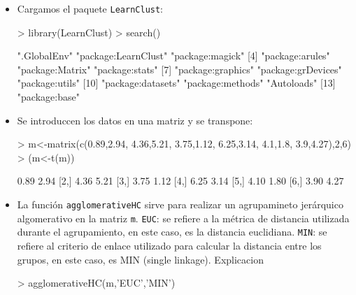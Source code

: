 \documentclass[a4paper, 12pt]{article}
\begin{document}
	\begin{itemize}
	  \item Cargamos el paquete \texttt{LearnClust}:
\begin{Schunk}
\begin{Sinput}
> library(LearnClust)
> search()
\end{Sinput}
\begin{Soutput}
 [1] ".GlobalEnv"         "package:LearnClust" "package:magick"    
 [4] "package:arules"     "package:Matrix"     "package:stats"     
 [7] "package:graphics"   "package:grDevices"  "package:utils"     
[10] "package:datasets"   "package:methods"    "Autoloads"         
[13] "package:base"      
\end{Soutput}
\end{Schunk}
		\item Se introduccen los datos en una matriz y se transpone:
\begin{Schunk}
\begin{Sinput}
> m<-matrix(c(0.89,2.94, 4.36,5.21, 3.75,1.12, 6.25,3.14, 4.1,1.8, 3.9,4.27),2,6)
> (m<-t(m))
\end{Sinput}
\begin{Soutput}
     [,1] [,2]
[1,] 0.89 2.94
[2,] 4.36 5.21
[3,] 3.75 1.12
[4,] 6.25 3.14
[5,] 4.10 1.80
[6,] 3.90 4.27
\end{Soutput}
\end{Schunk}
		\item La función \texttt{agglomerativeHC} sirve para realizar un agrupamineto jerárquico algomerativo en la matriz \texttt{m}.
		\texttt{EUC}: se refiere a la métrica de distancia utilizada durante el agrupamiento, en este caso, es la distancia euclidiana.
		\texttt{MIN}: se refiere al criterio de enlace utilizado para calcular la distancia entre los grupos, en este caso, es MIN (single linkage).
		Explicacion
\begin{Schunk}
\begin{Sinput}
> agglomerativeHC(m,'EUC','MIN')
\end{Sinput}
\end{Schunk}
\end{itemize}
\end{document}
